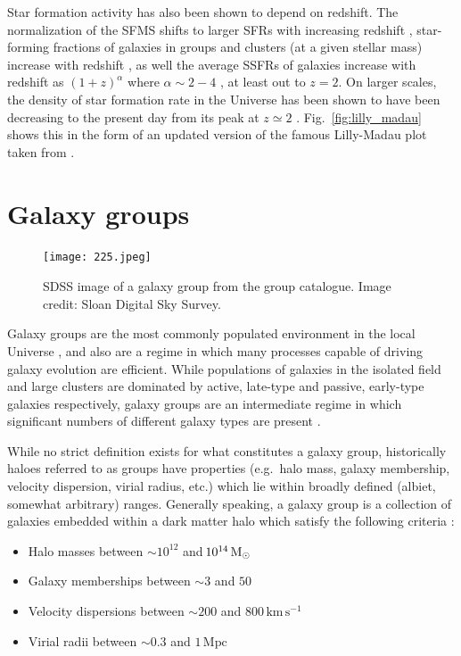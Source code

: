 Star formation activity has also been shown to depend on redshift.
The normalization of the SFMS shifts to larger SFRs with increasing
redshift \citep{karim2011, whitaker2012, lee2015, erfanianfar2016},
star-forming fractions of galaxies in groups and clusters (at a given
stellar mass) increase with redshift \citep{mcgee2011, hou2013,
  nantais2013}, as well the average SSFRs of galaxies increase with
redshift as $(1+z)^\alpha$ where $\alpha \sim 2-4$
\citep{oliver2010, whitaker2012}, at least out to $z=2$.  On larger
scales, the density of star formation rate in the Universe has been
shown to have been decreasing to the present day from its peak at $z
\simeq 2$ \citep[e.g.][]{madau1998, madau2014}.
Fig.~\ref{fig:lilly_madau} shows this in the form of an updated
version of the famous Lilly-Madau plot taken from \citet{madau2014}.

\section{Galaxy groups}
\label{sec:groups}

\begin{figure}[!ht]
  \centering
  \texttt{[image: 225.jpeg]}
  \caption{SDSS image of a galaxy group from the \citet{yang2007}
    group catalogue.  Image credit: Sloan Digital Sky Survey.}
  \label{fig:sdss_225}
\end{figure}

Galaxy groups are the most commonly populated environment in the local
Universe \citep{geller1983, eke2005}, and also are a regime in which
many processes capable of driving galaxy evolution are efficient.
While populations of galaxies in the isolated field and large clusters are
dominated by active, late-type and passive, early-type galaxies
respectively, galaxy groups are an intermediate regime in which
significant numbers of different galaxy types are present
\citep{wilman2005, mcgee2011}.
\par
While no strict definition exists for what constitutes a galaxy
group, historically haloes referred to as groups have properties
(e.g.\ halo mass, galaxy membership, velocity dispersion, virial
radius, etc.) which lie within broadly defined (albiet, somewhat
arbitrary) ranges.  Generally
speaking, a galaxy group is a collection of galaxies embedded within a
dark matter halo which satisfy the following criteria
\citep{mamon2007, connelly2012}:

\begin{itemize}
  \item Halo masses between $\sim\!10^{12}$ and $\!10^{14}\,\mathrm{M_{\odot}}$

  \item Galaxy memberships between $\sim\!3$ and $50$

  \item Velocity dispersions between $\sim\!200$ and
    $800\,\mathrm{km}\,\mathrm{s^{-1}}$
  
  \item Virial radii between $\sim\! 0.3$ and $1\,\mathrm{Mpc}$
\end{itemize}

